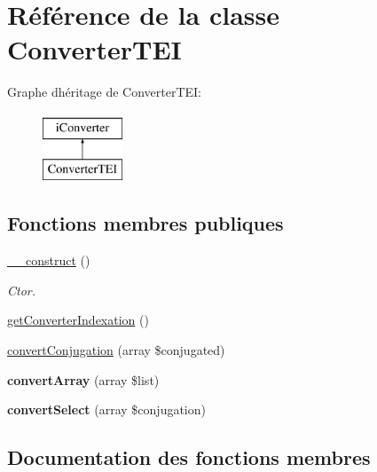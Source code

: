 \hypertarget{classConverterTEI}{}\section{Référence de la classe Converter\+T\+EI}
\label{classConverterTEI}
Graphe d\textquotesingle{}héritage de Converter\+T\+EI\+:\begin{figure}[H]
\begin{center}
\leavevmode
\includegraphics[height=2.000000cm]{classConverterTEI}
\end{center}
\end{figure}
\subsection*{Fonctions membres publiques}
\begin{DoxyCompactItemize}
\item 
\hypertarget{classConverterTEI_a13a33009d3a4829179627836450ea31a}{}\label{classConverterTEI_a13a33009d3a4829179627836450ea31a} 
\hyperlink{classConverterTEI_a13a33009d3a4829179627836450ea31a}{\+\_\+\+\_\+construct} ()
\begin{DoxyCompactList}\small\item\em Ctor. \end{DoxyCompactList}\item 
\hyperlink{classConverterTEI_a49fd33e0b0401c7bfaef1cca1bcee72c}{get\+Converter\+Indexation} ()
\item 
\hyperlink{classConverterTEI_a33798e9ea3e043efe980706e39e160d4}{convert\+Conjugation} (array \$conjugated)
\item 
\hypertarget{classConverterTEI_a3fcbf8ff1aa0399845dbec91faf17490}{}\label{classConverterTEI_a3fcbf8ff1aa0399845dbec91faf17490} 
{\bfseries convert\+Array} (array \$list)
\item 
\hypertarget{classConverterTEI_abb47b4d3c4c9d0787064f23a368ffa6d}{}\label{classConverterTEI_abb47b4d3c4c9d0787064f23a368ffa6d} 
{\bfseries convert\+Select} (array \$conjugation)
\end{DoxyCompactItemize}


\subsection{Documentation des fonctions membres}
\hypertarget{classConverterTEI_a33798e9ea3e043efe980706e39e160d4}{}\label{classConverterTEI_a33798e9ea3e043efe980706e39e160d4} 
